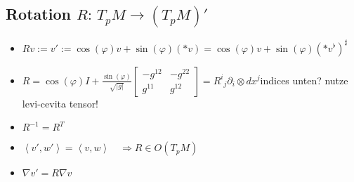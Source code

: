 \documentclass{scrartcl}
\newlength{\wlen}
\newcommand{\upperleftright}[3]{\,\settowidth{\wlen}{$#2$}\hspace{-\wlen}\mbox{$\phantom{#2}$}^{#1}{#2}^{#3}}
\newcommand{\sftensor}[3]{{{#1}^{#2}}_{#3}}
\newcommand{\sfbasis}[2]{\partial_{#1}\otimes dx^{#2}}
\begin{document}
    \subsection{Rotation \( R:\, T_{p}M \rightarrow (T_{p}M)' \)}
      \begin{itemize}
        \item \( Rv := v' := \cos(\varphi) v + \sin(\varphi)(*v) 
                           = \cos(\varphi) v + \sin(\varphi)(*v^{\flat})^{\sharp}\)
        \item \( R = \cos(\varphi)I + \frac{\sin(\varphi)}{\sqrt{|g|}}
                    \begin{bmatrix}
                      -g^{12} & -g^{22} \\
                      g^{11} & g^{12}
                    \end{bmatrix} 
                 = \sftensor{R}{i}{j} \sfbasis{i}{j}\){\color{red}indices unten? nutze levi-cevita tensor!}
        \item \( R^{-1} = R^{T} \)
        \item \( \left\langle v',w' \right\rangle = \left\langle v,w \right\rangle 
                  \quad \Rightarrow R\in O(T_{p}M) \)
        \item \( \nabla v' = R\nabla v \)
      \end{itemize}

\end{document}
